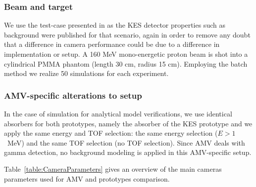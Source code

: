 \documentclass[a4paper,english]{article}
\begin{document}
\subsubsection{Beam and target}

We use the test-case presented in \cite{Perali2014} as the KES detector properties such as background were published for that scenario, again in order to remove any doubt that a difference in camera performance could be due to a difference in implementation or setup. A 160 MeV mono-energetic proton beam is shot into a cylindrical PMMA phantom (length 30 cm, radius 15 cm). Employing the batch method we realize 50 simulations for each experiment.

\subsubsection{AMV-specific alterations to setup}


In the case of simulation for analytical model verifications, we use identical absorbers for both prototypes, namely the absorber of the KES prototype and we apply the same energy and TOF selection: the same energy selection ($E> 1$~MeV) and the same TOF selection (no TOF selection). Since AMV deals with gamma detection, no background modeling is applied in this AMV-specific setup. 

Table~\ref{table:CameraParameters} gives an overview of the main cameras parameters used for AMV and prototypes comparison.
\end{document}
